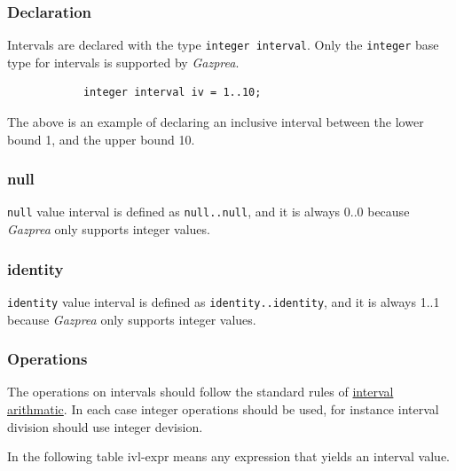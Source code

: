 \documentclass{article}
\begin{document}
	\subsubsection{Declaration}

		Intervals are declared with the type \texttt{integer interval}. Only the \texttt{integer} base type for
		intervals is supported by \textit{Gazprea}.

		\begin{lstlisting}
			integer interval iv = 1..10;
		\end{lstlisting}

		The above is an example of declaring an inclusive interval between the lower bound 1, and the upper bound 10.

	\subsubsection{null}

		\texttt{null} value interval is defined as \texttt{null..null}, and it is always 0..0 because \textit{Gazprea}
		only supports integer values.

	\subsubsection{identity}

		\texttt{identity} value interval is defined as \texttt{identity..identity}, and it is always 1..1 because
		\textit{Gazprea} only supports integer values.

	\subsubsection{Operations}

		The operations on intervals should follow the standard rules of
		\href{http://en.wikipedia.org/wiki/Interval_arithmetic}{interval arithmatic}. In each case integer operations
		should be used, for instance interval division should use integer devision.

		In the following table ivl-expr means any expression that yields an interval value.
\end{document}
